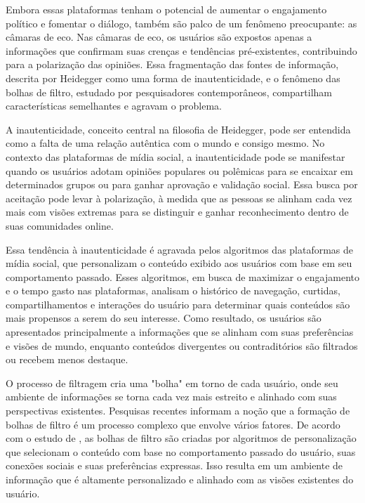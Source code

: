 Embora essas plataformas tenham o potencial de aumentar o engajamento político e fomentar o diálogo, também são palco de um fenômeno preocupante: as câmaras de eco. Nas câmaras de eco, os usuários são expostos apenas a informações que confirmam suas crenças e tendências pré-existentes, contribuindo para a polarização das opiniões. Essa fragmentação das fontes de informação, descrita por Heidegger como uma forma de inautenticidade, e o fenômeno das bolhas de filtro, estudado por pesquisadores contemporâneos, compartilham características semelhantes e agravam o problema.

A inautenticidade, conceito central na filosofia de Heidegger, pode ser entendida como a falta de uma relação autêntica com o mundo e consigo mesmo. No contexto das plataformas de mídia social, a inautenticidade pode se manifestar quando os usuários adotam opiniões populares ou polêmicas para se encaixar em determinados grupos ou para ganhar aprovação e validação social. Essa busca por aceitação pode levar à polarização, à medida que as pessoas se alinham cada vez mais com visões extremas para se distinguir e ganhar reconhecimento dentro de suas comunidades online.

Essa tendência à inautenticidade é agravada pelos algoritmos das plataformas de mídia social, que personalizam o conteúdo exibido aos usuários com base em seu comportamento passado. Esses algoritmos, em busca de maximizar o engajamento e o tempo gasto nas plataformas, analisam o histórico de navegação, curtidas, compartilhamentos e interações do usuário para determinar quais conteúdos são mais propensos a serem do seu interesse. Como resultado, os usuários são apresentados principalmente a informações que se alinham com suas preferências e visões de mundo, enquanto conteúdos divergentes ou contraditórios são filtrados ou recebem menos destaque.

O processo de filtragem cria uma "bolha" em torno de cada usuário, onde seu ambiente de informações se torna cada vez mais estreito e alinhado com suas perspectivas existentes. Pesquisas recentes informam a noção que a formação de bolhas de filtro é um processo complexo que envolve vários fatores. De acordo com o estudo de , as bolhas de filtro são criadas por algoritmos de personalização que selecionam o conteúdo com base no comportamento passado do usuário, suas conexões sociais e suas preferências expressas. Isso resulta em um ambiente de informação que é altamente personalizado e alinhado com as visões existentes do usuário.

